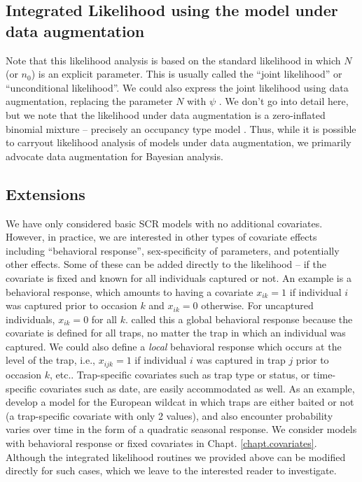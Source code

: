 \subsection{Integrated Likelihood using the model under data augmentation } 

Note that this likelihood analysis is based on the standard likelihood
in which $N$ (or $n_{0}$) is an explicit parameter. This is usually called
the ``joint likelihood'' or ``unconditional likelihood''.  We could also
express the joint likelihood using data augmentation, replacing the
parameter $N$ with $\psi$ \citep[e.g., see Sec. 7.1.6][for an example]{royle_dorazio:2008}.
We don't go into detail here, but we note that the
likelihood under data augmentation is a zero-inflated binomial
mixture – precisely an occupancy type model \citep{royle:2006}.
Thus, while it is possible to carryout likelihood analysis of
models under data augmentation, we primarily advocate data
augmentation for Bayesian analysis.


\subsection{ Extensions}

We have only considered basic SCR models with no additional
covariates. However, in practice, we are interested in other types of
covariate effects including ``behavioral response'', 
sex-specificity of parameters, and potentially other effects. Some of
these  can be added directly to the likelihood – if the covariate is fixed
and known for all individuals captured or not. An example is a
behavioral response, which amounts to having a covariate $x_{ik}=1$ if
individual $i$ was captured prior to occasion $k$ and $x_{ik}=0$
otherwise. For uncaptured individuals, $x_{ik}=0$ for all $k$.
 \citet{royle_etal:2011jwm} called this a global behavioral
response because the covariate is defined for all traps, no matter the
trap in which an individual was captured. We could also define a {\it
  local} behavioral response which occurs at the level of the trap,
i.e., $x_{ijk}=1$ if individual $i$ was captured in trap $j$ prior to
occasion $k$, etc.. 
Trap-specific covariates such as trap type or status, or
time-specific covariates such as date, are easily accommodated as
well. As an example, \citet{kery_etal:2010} develop a model for the
European wildcat in which traps are either baited or not (a
trap-specific covariate with only 2 values), and also encounter
probability varies over time in the form of a quadratic seasonal response.
We consider models with behavioral response or fixed covariates in
Chapt. \ref{chapt.covariates}.
Although the integrated likelihood routines we provided above can be
modified directly for such cases, which we leave to the interested
reader to investigate. 

